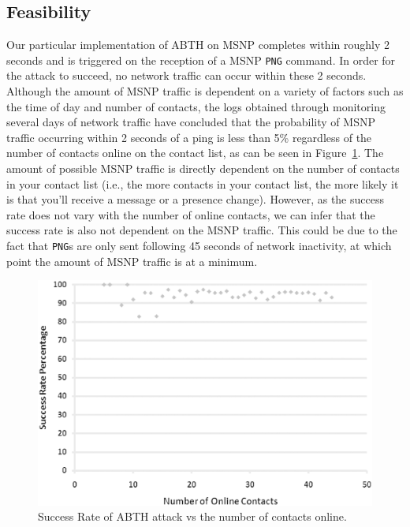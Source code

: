 \documentclass{sig-alternate}
\begin{document}
\subsection{Feasibility}

Our particular implementation of ABTH on MSNP completes within roughly 2 seconds and is triggered on the reception of a MSNP \texttt{PNG} command.
In order for the attack to succeed, no network traffic can occur within these 2 seconds.
Although the amount of MSNP traffic is dependent on a variety of factors such as the time of day and number of contacts, the logs obtained through monitoring several days of network traffic have concluded that the probability of MSNP traffic occurring within 2 seconds of a ping is less than 5\% regardless of the number of contacts online on the contact list, as can be seen in Figure~\ref{fig:successrate}.
The amount of possible MSNP traffic is directly dependent on the number of contacts in your contact list (i.e., the more contacts in your contact list, the more likely it is that you'll receive a message or a presence change). 
However, as the success rate does not vary with the number of online contacts, we can infer that the success rate is also not dependent on the MSNP traffic.
This could be due to the fact that \texttt{PNG}s are only sent following 45 seconds of network inactivity, at which point the amount of MSNP traffic is at a minimum.

\begin{figure}[h]
	\centering
	\caption{Success Rate of ABTH attack vs the number of contacts online.}
	\label{fig:successrate}
	\includegraphics[width=\columnwidth]{graphics/plot.eps}
\end{figure}
\end{document}
